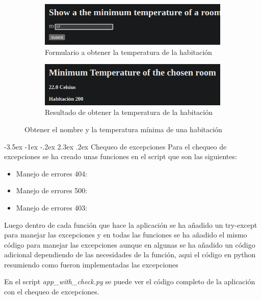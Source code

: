 \documentclass[11pt]{report}
\makeatletter
\renewcommand\chapter{\@startsection{chapter}{0}{\z@}%
    {-3.5ex \@plus -1ex \@minus -.2ex}%
    {2.3ex \@plus.2ex}%
    {\normalfont\Large\bfseries}}
\makeatother
\begin{document}
\begin{figure}[H]
  \begin{subfigure}{0.5\textwidth}
    \centering
    \includegraphics[scale=0.34]{img/min_temperature.png}
    \caption{Formulario a obtener la temperatura de la habitación}
  \end{subfigure}%
  \begin{subfigure}{0.5\textwidth}
    \centering
    \includegraphics[scale=0.34]{img/result_min_temperature.png}
    \caption{Resultado de obtener la temperatura de la habitación}
  \end{subfigure}
  \caption{Obtener el nombre y la temperatura mínima de una habitación}
\end{figure}

\cleardoublepage

\chapter{Chequeo de excepciones}
Para el chequeo de excepciones se ha creado unas funciones en el script que son las siguientes:
\begin{itemize}
  \item Manejo de errores 404: 
\lstset{style=mystyle}


  \item Manejo de errores 500:
\lstset{style=mystyle}


  \item Manejo de errores 403:
\lstset{style=mystyle}

\end{itemize}

Luego dentro de cada función que hace la aplicación se ha añadido un try-except para manejar las excepciones y en todas 
las funciones se ha añadido el mismo código para manejar las excepciones aunque en algunas se ha añadido un código adicional
dependiendo de las necesidades de la función, aqui el código en python resumiendo como fueron implementadas las excepciones
\lstset{style=mystyle}


En el script \emph{app\_with\_check.py} se puede ver el código completo de la aplicación con el chequeo de excepciones.
\end{document}
